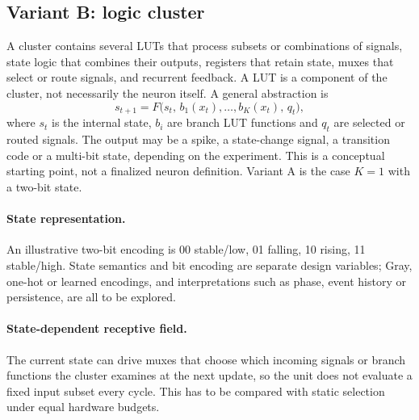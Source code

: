\subsection{Variant B: logic cluster}
A cluster contains several LUTs that process subsets or combinations of signals, state logic that combines their outputs, registers that retain state, muxes that select or route signals, and recurrent feedback. A LUT is a component of the cluster, not necessarily the neuron itself. A general abstraction is
\begin{equation}
s_{t+1} = F\bigl(s_t,\, b_1(x_t),\dots,b_K(x_t),\, q_t\bigr),
\end{equation}
where $s_t$ is the internal state, $b_i$ are branch LUT functions and $q_t$ are selected or routed signals. The output may be a spike, a state-change signal, a transition code or a multi-bit state, depending on the experiment. This is a conceptual starting point, not a finalized neuron definition. Variant A is the case $K=1$ with a two-bit state. 

\paragraph{State representation.} An illustrative two-bit encoding is 00 stable/low, 01 falling, 10 rising, 11 stable/high. State semantics and bit encoding are separate design variables; Gray, one-hot or learned encodings, and interpretations such as phase, event history or persistence, are all to be explored.

\paragraph{State-dependent receptive field.} The current state can drive muxes that choose which incoming signals or branch functions the cluster examines at the next update, so the unit does not evaluate a fixed input subset every cycle. This has to be compared with static selection under equal hardware budgets.

